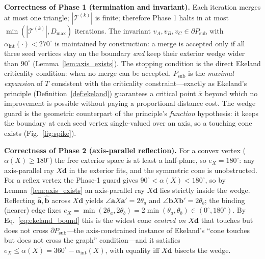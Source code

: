\documentclass[10pt]{article}
\theoremstyle{plain}
\theoremstyle{definition}
\begin{document}
\noindent\textbf{Correctness of Phase 1 (termination and invariant).}
Each iteration merges at most one triangle; $|\mathcal{T}^{(k)}|$ is finite;
therefore Phase 1 halts in at most $\min(|\mathcal{T}^{(k)}|, D_{\max})$
iterations.
The invariant
$v_A,v_B,v_C \in \partial P_{\mathrm{sub}}$ with $\alpha_{\mathrm{int}}(\cdot)<270^\circ$
is maintained by construction: a merge is accepted only if all three seed
vertices stay on the boundary \emph{and} keep their exterior wedge wider than
$90^\circ$ (Lemma~\ref{lem:axis_exists}).
The stopping condition is the direct Ekeland criticality condition: when
no merge can be accepted, $P_{\mathrm{sub}}$ is the \emph{maximal expansion}
of $T$ consistent with the criticality constraint---exactly as Ekeland's
principle (Definition~\ref{def:ekeland}) guarantees a critical point
$\bar{x}$ beyond which no improvement is possible without paying a proportional
distance cost. The wedge guard is the geometric counterpart of the principle's
\emph{function} hypothesis: it keeps the boundary at each seed vertex
single-valued over an axis, so a touching cone exists (Fig.~\ref{fig:spike}).

\noindent\textbf{Correctness of Phase 2 (axis-parallel reflection).}
For a convex vertex ($\alpha(X) \ge 180^\circ$) the free exterior space is at
least a half-plane, so $e_X = 180^\circ$: any axis-parallel ray $X\mathbf{d}$ in
the exterior fits, and the symmetric cone is unobstructed.
For a reflex vertex the Phase-1 guard gives $90^\circ<\alpha(X)<180^\circ$, so by
Lemma~\ref{lem:axis_exists} an axis-parallel ray $X\mathbf{d}$ lies strictly
inside the wedge. Reflecting $\hat{\mathbf{a}},\hat{\mathbf{b}}$ across
$X\mathbf{d}$ yields $\angle\mathbf{a}X\mathbf{a}'=2\theta_a$ and
$\angle\mathbf{b}X\mathbf{b}'=2\theta_b$; the binding (nearer) edge fixes
$e_X=\min(2\theta_a,2\theta_b)=2\min(\theta_a,\theta_b)\in(0^\circ,180^\circ)$.
By Eq.~\eqref{eq:ekeland_bound} this is the widest cone \emph{centred on
$X\mathbf{d}$} that touches but does not cross $\partial P_{\mathrm{sub}}$---the
axis-constrained instance of Ekeland's ``cone touches but does not cross the
graph'' condition---and it satisfies $e_X\le\alpha(X)=360^\circ-\alpha_{\mathrm{int}}(X)$,
with equality iff $X\mathbf{d}$ bisects the wedge.
\end{document}

